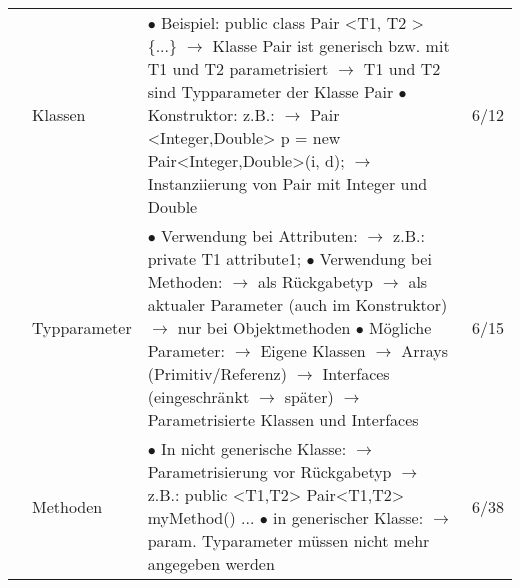 \documentclass[11pt,a4paper]{article}
\begin{document}
\begin{center}
\begin{longtable}[h]{ | p{2.3cm} | p{2.3cm} | p{12.6cm} | p{1.2cm} | }
	& Klassen & \makecell[l]{$\bullet$ Beispiel: public class Pair <T1, T2 > \{...\} \\ 
	\hspace{0.4cm} $\rightarrow$ Klasse Pair ist generisch bzw. mit T1 und T2 parametrisiert \\ 
	\hspace{0.4cm} $\rightarrow$ T1 und T2 sind Typparameter der Klasse Pair \\ 
	$\bullet$ Konstruktor: z.B.: \\ \hspace{0.2cm} $\rightarrow$ Pair <Integer,Double> p = new Pair<Integer,Double>(i, d); \\ 
	\hspace{0.2cm} $\rightarrow$ Instanziierung von Pair mit Integer und Double}  & 6/12 \\ \cline{2-4}
	
	& Typparameter & \makecell[l]{$\bullet$ Verwendung bei Attributen: \\ 
	\hspace{0.4cm} $\rightarrow$ z.B.: private T1 attribute1; \\ $\bullet$ Verwendung bei Methoden: \\ 
	\hspace{0.4cm} $\rightarrow$ als Rückgabetyp \\ 
	\hspace{0.4cm} $\rightarrow$ als aktualer Parameter (auch im Konstruktor) \\
	\hspace{0.4cm} $\rightarrow$ nur bei Objektmethoden \\
	$\bullet$ Mögliche Parameter: \\
	\hspace{0.4cm} $\rightarrow$ Eigene Klassen \\ \hspace{0.4cm} $\rightarrow$ Arrays (Primitiv/Referenz) \\
	\hspace{0.4cm} $\rightarrow$ Interfaces (eingeschränkt $\rightarrow$ später)\\ 
	\hspace{0.4cm} $\rightarrow$ Parametrisierte Klassen und Interfaces \\ }  & 6/15 \\ \cline{2-4}
	
	& Methoden & \makecell[l]{$\bullet$ In nicht generische Klasse: \\ 
	\hspace{0.4cm} $\rightarrow$ Parametrisierung vor Rückgabetyp \\ 
	\hspace{0.4cm} $\rightarrow$ z.B.: public <T1,T2> Pair<T1,T2> myMethod() ... \\ 
	$\bullet$ in generischer Klasse: \\ 
	\hspace{0.4cm} $\rightarrow$ param. Typarameter müssen nicht mehr angegeben werden}  & 6/38 \\ \cline{2-4}
	

\end{longtable}
\end{center}
\end{document}
